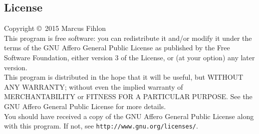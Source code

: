 \documentclass[a4paper,openright,twoside]{report}
\renewcommand{\listoffigures}{\begingroup
	\tocchapter
	\tocfile{\listfigurename}{lof}
\endgroup}
\renewcommand{\listoftables}{\begingroup
	\tocchapter
	\tocfile{\listtablename}{lot}
\endgroup}
\begin{document}
\begin{appendix}

\listoffigures

\listoftables

\chapter{License}
Copyright \copyright\ 2015 Marcus Fihlon
\\[0.25cm]
This program is free software: you can redistribute it and/or modify it under the terms of the GNU Affero General Public License as published by the Free Software Foundation, either version 3 of the License, or (at your option) any later version.
\\[0.25cm]
This program is distributed in the hope that it will be useful, but WITHOUT ANY WARRANTY; without even the implied warranty of MERCHANTABILITY or FITNESS FOR A PARTICULAR PURPOSE. See the GNU Affero General Public License for more details.
\\[0.25cm]
You should have received a copy of the GNU Affero General Public License along with this program. If not, see \texttt{http://www.gnu.org/licenses/}.

\end{appendix}
\end{document}
